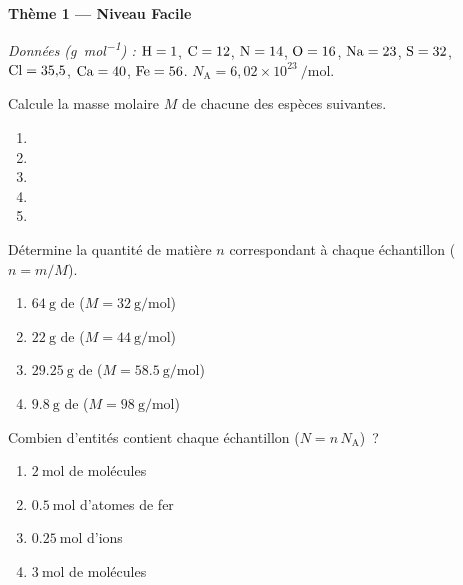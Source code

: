 \documentclass[11pt,a4paper]{article}
\begin{document}
\begin{center}{\large\bfseries\color{primarydark} Thème 1 — Niveau Facile}\end{center}
\emph{Données (\si{\gram\per\mole}) :} $\ce{H}=1$, $\ce{C}=12$, $\ce{N}=14$, $\ce{O}=16$,
$\ce{Na}=23$, $\ce{S}=32$, $\ce{Cl}=35{,}5$, $\ce{Ca}=40$, $\ce{Fe}=56$. \quad
$N_{\mathrm{A}} = 6{,}02\times10^{23}\ \si{\per\mole}$.

\begin{exo}
Calcule la masse molaire $M$ de chacune des espèces suivantes.
\begin{enumerate}[label=\alph*)]
  \item {}
  \item {}
  \item {}
  \item {}
  \item {}
\end{enumerate}
\end{exo}

\begin{exo}
Détermine la quantité de matière $n$ correspondant à chaque échantillon ($n = m/M$).
\begin{enumerate}[label=\alph*)]
  \item $\SI{64}{\gram}$ de  \quad ($M=\SI{32}{\gram\per\mole}$)
  \item $\SI{22}{\gram}$ de  \quad ($M=\SI{44}{\gram\per\mole}$)
  \item $\SI{29.25}{\gram}$ de  \quad ($M=\SI{58.5}{\gram\per\mole}$)
  \item $\SI{9.8}{\gram}$ de  \quad ($M=\SI{98}{\gram\per\mole}$)
\end{enumerate}
\end{exo}

\begin{exo}
Combien d'entités contient chaque échantillon ($N = n\,N_{\mathrm{A}}$)~?
\begin{enumerate}[label=\alph*)]
  \item $\SI{2}{\mole}$ de molécules 
  \item $\SI{0.5}{\mole}$ d'atomes de fer
  \item $\SI{0.25}{\mole}$ d'ions 
  \item $\SI{3}{\mole}$ de molécules 
\end{enumerate}
\end{exo}
\end{document}

